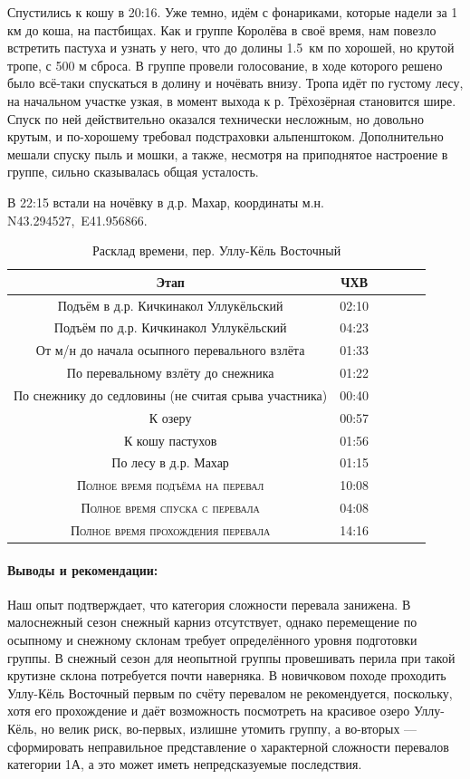 Спустились к кошу в 20:16. Уже темно, идём с фонариками, которые надели за 1 км до коша, на пастбищах. Как и группе Королёва в своё время, нам повезло встретить пастуха и узнать у него, что до долины 1.5~км по хорошей, но крутой тропе, с 500 м сброса. В группе провели голосование, в ходе которого решено было всё-таки спускаться в долину и ночёвать внизу. Тропа идёт по густому лесу, на начальном участке узкая, в момент выхода к р. Трёхозёрная становится шире. Спуск по ней действительно оказался технически несложным, но довольно крутым, и по-хорошему требовал подстраховки альпенштоком. Дополнительно мешали спуску пыль и мошки, а также, несмотря на приподнятое настроение в группе, сильно сказывалась общая усталость.

В 22:15 встали на ночёвку в д.р. Махар, координаты м.н. N43.294527\degree,~E41.956866\degree.

\clearpage 

\begin{table}[h!]
	\centering
	\begin{tabular}{|c|c|c|c|c|c|} 
		\hline 
		Этап & ЧХВ \\ 	
		\hline 
		Подъём в д.р. Кичкинакол Уллукёльский  & 02:10 \\
		Подъём по д.р. Кичкинакол Уллукёльский  & 04:23 \\
		От м/н до начала осыпного перевального взлёта & 01:33\\ 
		По перевальному взлёту до снежника & 01:22\\ 
		По снежнику до седловины (не считая срыва участника) & 00:40\\ 
		К озеру & 00:57 \\
		К кошу пастухов & 01:56 \\
		По лесу в д.р. Махар & 01:15 \\
		\hline
		\textsc{Полное время подъёма на перевал  }& 10:08\\
		\textsc{Полное время спуска с перевала }& 04:08 \\
	\textsc{	Полное время прохождения перевала }& 14:16 \\
		\hline
	\end{tabular}
	\caption{Расклад времени, пер. Уллу-Кёль Восточный}
\end{table}

\paragraph{Выводы и рекомендации:} Наш опыт подтверждает, что категория сложности перевала занижена. В малоснежный сезон снежный карниз отсутствует, однако перемещение по осыпному и снежному склонам требует определённого уровня подготовки группы. В снежный сезон для неопытной группы провешивать перила при такой крутизне склона потребуется почти наверняка. В новичковом походе проходить Уллу-Кёль Восточный первым по счёту перевалом не рекомендуется, поскольку, хотя его прохождение и даёт возможность посмотреть на красивое озеро Уллу-Кёль, но велик риск, во-первых, излишне утомить группу, а во-вторых --- сформировать неправильное представление о характерной сложности перевалов категории 1А, а это может иметь непредсказуемые последствия. 

\clearpage

